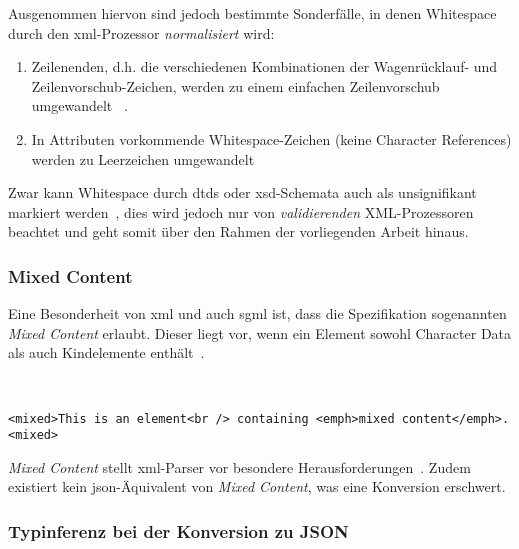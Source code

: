 \begin{samepage}
    Ausgenommen hiervon sind jedoch bestimmte Sonderfälle, in denen Whitespace durch den \acrshort{xml}-Prozessor \emph{normalisiert} wird:
    \begin{enumerate}
        \item{} Zeilenenden, d.h. die verschiedenen Kombinationen der Wagenrücklauf- und \linebreak{}Zeilenvorschub-Zeichen, werden zu einem einfachen Zeilenvorschub umgewandelt ~\cite[Abschn.~2.11]{maler2008xml}.
        \item{} In Attributen vorkommende Whitespace-Zeichen (keine Character References) werden zu Leerzeichen umgewandelt~\cite[Abschn.~3.3.3]{maler2008xml}
    \end{enumerate}
\end{samepage}

Zwar kann Whitespace durch \glspl{dtd} oder \acrshort{xsd}-Schemata auch als unsignifikant markiert werden~\cite{page2005whitespace}, dies wird jedoch nur von \emph{validierenden} XML-Prozessoren beachtet und geht somit über den Rahmen der vorliegenden Arbeit hinaus.

\subsubsection{Mixed Content}
\label{sec:mixedcontent}

Eine Besonderheit von \acrshort{xml} und auch \acrshort{sgml} ist, dass die Spezifikation sogenannten \emph{Mixed Content} erlaubt. Dieser liegt vor, wenn ein Element sowohl Character Data als auch Kindelemente enthält~\cite[Abschnitt 3.2.2]{maler2008xml}.

\begin{example}~
    \begin{verbatim}
<mixed>This is an element<br /> containing <emph>mixed content</emph>.<mixed>
    \end{verbatim}
\end{example}

\emph{Mixed Content} stellt \acrshort{xml}-Parser vor besondere Herausforderungen~\cite{mcgrath2002mixedcontent}. Zudem existiert kein \acrshort{json}-Äquivalent von \emph{Mixed Content}, was eine Konversion erschwert.

\subsubsection{Typinferenz bei der Konversion zu JSON}

